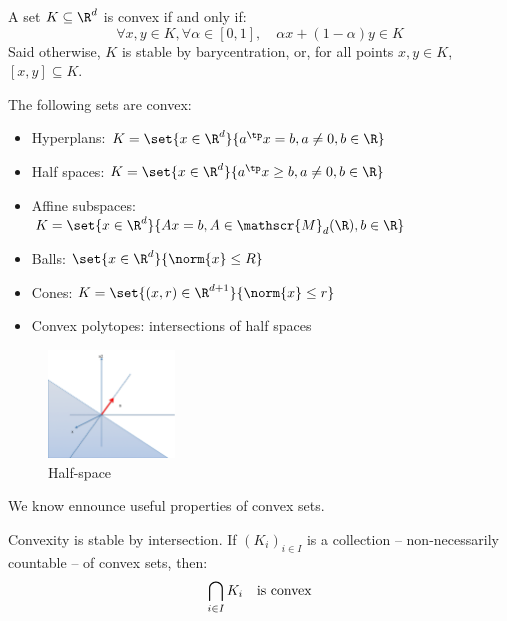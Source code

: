 \documentclass{../cs-classes/cs-classes}
\begin{document}
\begin{definition}
    A set $K\subseteq\R^d$ is convex if and only if:
    \begin{equation*}
        \forall x, y\in K, \forall \alpha\in[0, 1], \quad \alpha x+(1-\alpha)y \in K
    \end{equation*}
    Said otherwise, $K$ is stable by barycentration, or, for all points $x, y\in K$, $[x, y]\subseteq K$.
\end{definition}

\begin{example}
    The following sets are convex:
    \begin{itemize}
        \item Hyperplans: $K=\set{x\in\R^d}{a^\tp x = b, a\neq 0, b\in\R}$
        \item Half spaces: $K=\set{x\in\R^d}{a^\tp x\geq b, a\neq0, b\in\R}$
        \item Affine subspaces: $K=\set{x\in\R^d}{Ax=b, A\in\mathscr{M}_d(\R), b\in\R}$
        \item Balls: $\set{x\in\R^d}{\norm{x}\leq R}$
        \item Cones: $K=\set{(x, r)\in\R^{d+1}}{\norm{x}\leq r}$
        \item Convex polytopes: intersections of half spaces
    \end{itemize}
\end{example}

\begin{figure}
    \centering
        \captionsetup{justification=centering}
        \includegraphics[width=0.3\textwidth]{images/half-space.png}
        \caption{Half-space}
\end{figure}
We know ennounce useful properties of convex sets.
\begin{property}
    Convexity is stable by intersection. If $(K_i)_{i\in I}$ is a collection -- non-necessarily countable -- of convex sets, then:
    \begin{equation*}
        \bigcap_{i\in I}K_i \quad\textnormal{is convex}
    \end{equation*}
\end{property}
\end{document}
